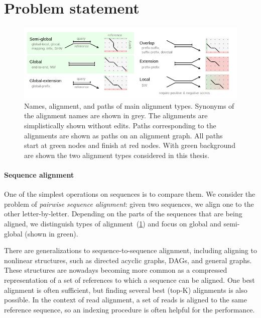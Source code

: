 \section*{Problem statement}

\begin{figure}[t]  %
    \includegraphics[width=\textwidth]{alignment-types-thesis.pdf}
	\caption[Main alignment types]{Names, alignment, and paths of main alignment
    types. Synonyms of the alignment names are shown in grey. The alignments are
    simplistically shown without edits. Paths corresponding to the alignments
    are shown as paths on an alignment graph. All paths start at green nodes and
    finish at red nodes. With green background are shown the two alignment types
    considered in this thesis.}
    \label{fig:alignment-types}
\end{figure}

\paragraph{Sequence alignment}
One of the simplest operations on sequences is to compare them. We consider the
problem of \emph{pairwise sequence alignment}: given two sequences, we align one
to the other letter-by-letter. Depending on the parts of the sequences that are
being aligned, we distinguish types of alignment~(\cref{fig:alignment-types})
and focus on global and semi-global (shown in green).

There are generalizations to sequence-to-sequence alignment, including aligning
to nonlinear structures, such as directed acyclic graphs, DAGs, and general
graphs. These structures are nowadays becoming more common as a compressed
representation of a set of references to which a sequence can be aligned. One
best alignment is often sufficient, but finding several best (top-K) alignments
is also possible. In the context of read alignment, a set of reads is aligned to
the same reference sequence, so an indexing procedure is often helpful for the
performance.


